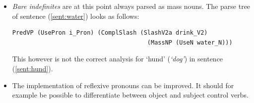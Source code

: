 \documentclass{report}
\begin{document}
\begin{itemize}

\item
\textit{Bare indefinites} are at this point always parsed as mass nouns.
\label{sent:water}
The parse tree of sentence (\ref{sent:water}) looks as follows:
\begin{verbatim}
PredVP (UsePron i_Pron) (ComplSlash (SlashV2a drink_V2) 
                                      (MassNP (UseN water_N))) 
\end{verbatim}

This however is not the correct analysis for `hund' (\emph{`dog'}) in sentence (\ref{sent:hund}).
\label{sent:hund}

\item
The implementation of reflexive pronouns can be improved.  %
It should for example be possible to differentiate between 
object and subject control verbs.


%

\end{itemize}
\end{document}
